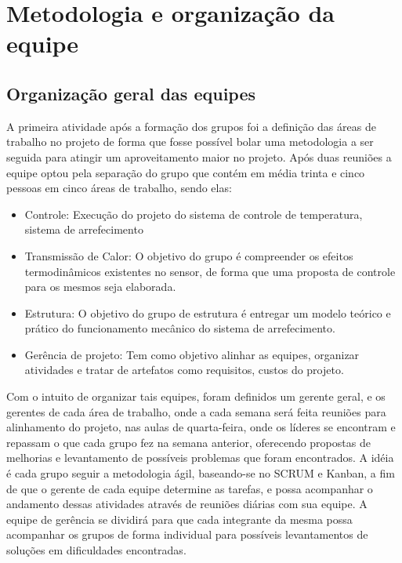 \chapter{Metodologia e organização da equipe}

\section{Organização geral das equipes}

A primeira atividade após a formação dos grupos foi a definição das áreas de trabalho no projeto de forma que fosse possível bolar uma metodologia a ser seguida para atingir um aproveitamento maior no projeto.
Após duas reuniões a equipe optou pela separação do grupo que contém em média trinta e cinco pessoas em cinco áreas de trabalho, sendo elas:

\begin{itemize}
\item Controle: Execução do projeto do sistema de controle de temperatura, sistema de arrefecimento
\item Transmissão de Calor: O objetivo do grupo é compreender os efeitos termodinâmicos existentes no sensor, de forma que uma proposta de controle para os mesmos seja elaborada.
\item Estrutura: O objetivo do grupo de estrutura é entregar um modelo teórico e prático do funcionamento mecânico do sistema de arrefecimento.
\item Gerência de projeto: Tem como objetivo alinhar as equipes, organizar atividades e tratar de artefatos como requisitos, custos do projeto.
\end{itemize}

Com o intuito de organizar tais equipes, foram definidos um gerente geral, e os gerentes de cada área de trabalho, onde a cada semana será feita reuniões para alinhamento do projeto, nas aulas de quarta-feira, onde os líderes se encontram e repassam o que cada grupo fez na semana anterior, oferecendo propostas de melhorias e levantamento de possíveis problemas que foram encontrados.
A idéia é cada grupo seguir a metodologia ágil, baseando-se no SCRUM e Kanban, a fim de que o gerente de cada equipe determine as tarefas, e possa acompanhar o andamento dessas atividades através de reuniões diárias com sua equipe.
A equipe de gerência se dividirá para que cada integrante da mesma possa acompanhar os grupos de forma individual para possíveis levantamentos de soluções em dificuldades encontradas.


